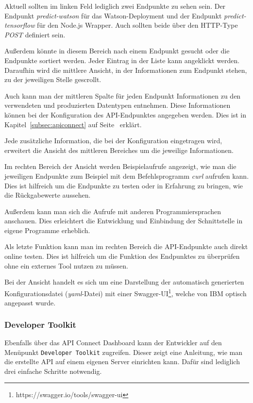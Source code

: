 Aktuell sollten im linken Feld lediglich zwei Endpunkte zu sehen sein. Der Endpunkt \textit{predict-watson} für das
Watson-Deployment und der Endpunkt \textit{predict-tensorflow} für den Node.js Wrapper. Auch sollten beide über
den HTTP-Type \textit{POST} definiert sein.

Außerdem könnte in diesem Bereich nach einem Endpunkt gesucht oder die Endpunkte sortiert werden. Jeder Eintrag in der Liste
kann angeklickt werden. Daraufhin wird die mittlere Ansicht, in der Informationen zum Endpunkt stehen, zu der jeweiligen
Stelle gescrollt.

Auch kann man der mittleren Spalte für jeden Endpunkt Informationen zu den verwendeten und produzierten Datentypen
entnehmen. Diese Informationen können bei der Konfiguration des API-Endpunktes angegeben werden. Dies ist in
Kapitel~\ref{subsec:apiconnect} auf Seite~\pageref{subsec:apiconnect} erklärt.

Jede zusätzliche Information, die bei der Konfiguration eingetragen wird, erweitert die Ansicht des mittleren Bereiches
um die jeweilige Informationen.

Im rechten Bereich der Ansicht werden Beispielaufrufe angezeigt, wie man die jeweiligen Endpunkte zum Beispiel mit dem
Befehlsprogramm \textit{curl} aufrufen kann. Dies ist hilfreich um die Endpunkte zu testen oder in Erfahrung zu bringen,
wie die Rückgabewerte aussehen.

Außerdem kann man sich die Aufrufe mit anderen Programmiersprachen anschauen. Dies erleichtert die Entwicklung und
Einbindung der Schnittstelle in eigene Programme erheblich.

Als letzte Funktion kann man im rechten Bereich die API-Endpunkte auch direkt online testen. Dies ist hilfreich um die
Funktion des Endpunktes zu überprüfen ohne ein externes Tool nutzen zu müssen.

Bei der Ansicht handelt es sich um eine Darstellung der automatisch generierten Konfigurationsdatei (\textit{yaml}-Datei)
mit einer Swagger-UI\footnote{https://swagger.io/tools/swagger-ui}, welche von IBM optisch angepasst wurde.

\subsubsection{Developer Toolkit}
Ebenfalls über das API Connect Dashboard kann der Entwickler auf den Menüpunkt \texttt{Developer Toolkit} zugreifen.
Dieser zeigt eine Anleitung, wie man die erstellte API auf einem eigenen Server einrichten kann. Dafür sind lediglich
drei einfache Schritte notwendig.

